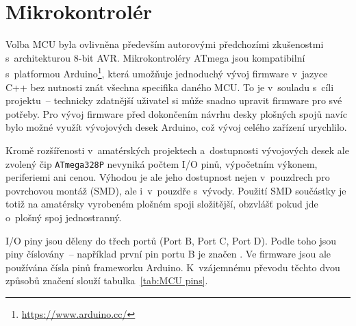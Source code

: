 \section{Mikrokontrolér}
Volba \acs{MCU} byla ovlivněna především autorovými předchozími zkušenostmi
s~architekturou 8-bit AVR. Mikrokontroléry ATmega jsou kompatibilní
s~platformou Arduino\footnote{\url{https://www.arduino.cc/}}, která umožňuje
jednoduchý vývoj firmware v~jazyce C++ bez nutnosti znát všechna specifika
daného MCU. To je v~souladu s~cíli projektu~-- technicky zdatnější uživatel si
může snadno upravit firmware pro své potřeby. Pro vývoj firmware před
dokončením návrhu desky plošných spojů navíc bylo možné využít vývojových desek
Arduino, což vývoj celého zařízení urychlilo.

Kromě rozšířenosti v~amatérských projektech a~dostupnosti vývojových desek ale
zvolený čip \texttt{ATmega328P} nevyniká počtem I/O pinů, výpočetním
výkonem, periferiemi ani cenou. Výhodou je ale jeho dostupnost nejen
v~pouzdrech pro povrchovou montáž (\acs{SMD}), ale i~v~pouzdře s~vývody.
Použití SMD součástky je totiž na amatérsky vyrobeném plošném spoji složitější,
obzvlášť pokud jde o~plošný spoj jednostranný.

\nocite{dshATmega328} %

I/O piny jsou děleny do třech portů (Port B, Port C, Port D). Podle toho jsou
piny číslovány~-- například první pin portu B je značen . Ve
firmware jsou ale používána čísla pinů frameworku Arduino. K~vzájemnému převodu
těchto dvou způsobů značení slouží tabulka~\vref{tab:MCU pins}.

